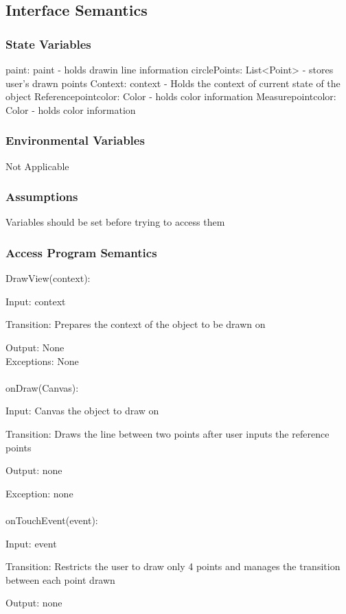 \documentclass[12,english]{article}
\begin{document}
		\subsection{Interface Semantics}
		\subsubsection{State Variables}
		paint: paint - holds drawin line information
		circlePoints: List<Point> - stores user's drawn points 
		Context: context - Holds the context of current state of the object
		Referencepointcolor: Color - holds color information
		Measurepointcolor: Color - holds color information
		
		\subsubsection{Environmental Variables}
		Not Applicable
		
		\subsubsection{Assumptions}
		Variables should be set before trying to access them
		
		\subsubsection{Access Program Semantics}
		DrawView(context):
		
		Input: context
		
		Transition: Prepares the context of the object to be drawn on
		
		Output: None\\
		Exceptions: None\\
		\\
		onDraw(Canvas):
		
		Input: Canvas the object to draw on
		
		Transition: Draws the line between two points after user inputs the reference points
		
		Output: none
		
		Exception: none\\ 
		\\
		onTouchEvent(event):
		
		Input: event
		
		Transition: Restricts the user to draw only 4 points and manages the transition between each point drawn
		
		Output: none
		
\end{document}
